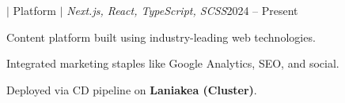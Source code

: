 \begin{project}{\textbf{\gregrosdev} $|$ Platform $|$
    \textit{Next.js, React, TypeScript, SCSS}}{2024 -- Present}
  \item Content platform built using industry-leading web technologies.
  \item Integrated marketing staples like Google Analytics, SEO, and social.
  \item Deployed via CD pipeline on \textbf{Laniakea (Cluster)}.
  \end{project}